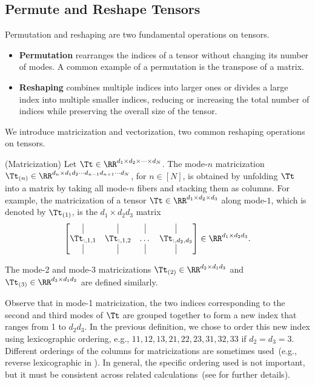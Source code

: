 \subsection{Permute and Reshape Tensors}
Permutation and reshaping are two fundamental operations on tensors.
\begin{itemize}
    \item \textbf{Permutation} rearranges the indices of a tensor without changing its number of modes. A common example of a permutation is the transpose of a matrix.
    \item  \textbf{Reshaping} combines multiple indices into larger ones or divides a large index into multiple smaller indices, reducing or increasing the total number of indices while preserving the overall size of the tensor.
\end{itemize}
We introduce matricization and vectorization, two common reshaping operations on tensors.
\begin{definition}(Matricization)\label{matricizitation:def}
Let $\Tt\in\RR^{d_1\times d_2\times \cdots\times d_N}$. The mode-$n$ matricization  $\Tt_{(n)}\in\RR^{d_n\times d_1d_2\cdots d_{n-1}d_{n+1}\cdots d_N}$, for $n\in[N]$, is obtained by unfolding $\Tt$ into a matrix by taking all mode-$n$ fibers and stacking them as columns. For example, the matricization of a tensor $\Tt\in\RR^{d_1\times d_2\times d_3}$ along mode-$1$, which is denoted by $\Tt_{(1)}$, is the $d_1\times d_2d_3$ matrix
$$
    \begin{bmatrix}
    \vline & \vline & \vline  & \vline \\
    \Tt_{:,1,1} & {\Tt}_{:,1,2}  & \dots  & {\Tt}_{:,d_2,d_3} \\
    \vline & \vline & \vline  & \vline 
    \end{bmatrix}
\in\RR^{d_1\times d_2d_3}.
$$

The mode-2 and mode-3 matricizations $\Tt_{(2)}\in\RR^{d_2\times d_1d_3}$ and $\Tt_{(3)}\in\RR^{d_3\times d_1d_2}$ are defined similarly.
\end{definition}

Observe that in mode-1 matricization, the two indices corresponding to the second and third modes of $\Tt$ are grouped together to form a new index that ranges from 1 to $d_2d_3$. In the previous definition, we chose to order this new index using lexicographic ordering, e.g., $11,12,13,21,22,23,31,32,33$ if $d_2=d_3=3$. Different orderings of the columns for matricizations are sometimes used~(e.g., reverse lexicographic in \citep{kolda2009tensor}). In general, the specific ordering
used is not important, but it must be consistent across related calculations~(see \citep{kolda2006multilinear} for further details).



